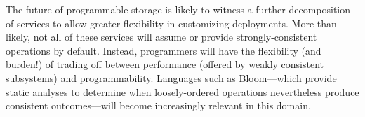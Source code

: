 \documentclass[10pt,twocolumn]{article}
\begin{document}
The future of programmable storage is likely to witness a further
decomposition of services to allow greater flexibility in customizing
deployments.  More than likely, not all of these services will assume or
provide strongly-consistent operations by default.  Instead, programmers will
have the flexibility (and burden!) of trading off between performance (offered
by weakly consistent subsystems) and programmability.  Languages such as
Bloom---which provide static analyses to determine when loosely-ordered
operations nevertheless produce consistent outcomes---will become increasingly
relevant in this domain.




\end{document}
